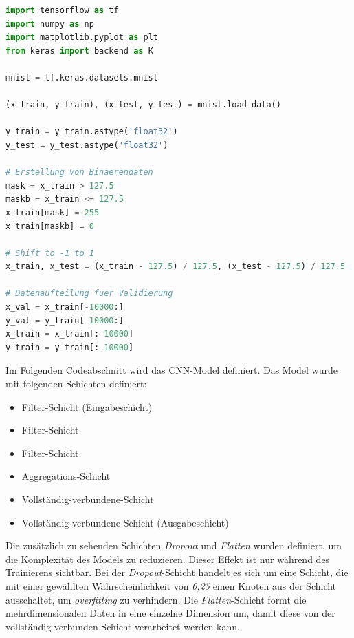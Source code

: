 \begin{minipage}{\textwidth}
	\begin{lstlisting}[language=Python, caption=Pythoncode zur Testvorbereitung vom CNN, label=lst:test_prep_cnn]
import tensorflow as tf
import numpy as np
import matplotlib.pyplot as plt
from keras import backend as K

mnist = tf.keras.datasets.mnist

(x_train, y_train), (x_test, y_test) = mnist.load_data()

y_train = y_train.astype('float32')
y_test = y_test.astype('float32')

# Erstellung von Binaerendaten 
mask = x_train > 127.5
maskb = x_train <= 127.5
x_train[mask] = 255
x_train[maskb] = 0

# Shift to -1 to 1
x_train, x_test = (x_train - 127.5) / 127.5, (x_test - 127.5) / 127.5

# Datenaufteilung fuer Validierung
x_val = x_train[-10000:]
y_val = y_train[-10000:]
x_train = x_train[:-10000]
y_train = y_train[:-10000]

	\end{lstlisting}
\end{minipage}

Im Folgenden Codeabschnitt wird das CNN-Model definiert. Das Model wurde mit folgenden Schichten definiert:

\begin{itemize}
	\item Filter-Schicht (Eingabeschicht)
	\item Filter-Schicht
	\item Filter-Schicht
	\item Aggregations-Schicht
	\item Vollständig-verbundene-Schicht
	\item Vollständig-verbundene-Schicht (Ausgabeschicht)
\end{itemize}

Die zusätzlich zu sehenden Schichten \textit{Dropout} und \textit{Flatten} wurden definiert, um die Komplexität des Models zu reduzieren. Dieser Effekt ist nur während des Trainierens sichtbar. Bei der \textit{Dropout}-Schicht handelt es sich um eine Schicht, die mit einer gewählten Wahrscheinlichkeit von \textit{0,25} einen Knoten aus der Schicht ausschaltet, um \textit{overfitting} zu verhindern. Die \textit{Flatten}-Schicht formt die mehrdimensionalen Daten in eine einzelne Dimension um, damit diese von der vollständig-verbunden-Schicht verarbeitet werden kann.

